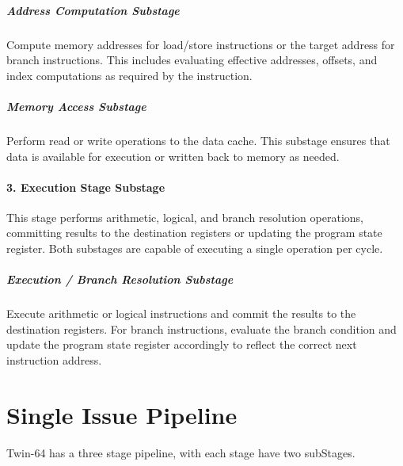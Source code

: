 \subparagraph{Address Computation Substage}
Compute memory addresses for load/store instructions or the target address for
branch instructions. This includes evaluating effective addresses, offsets,
and index computations as required by the instruction.

\subparagraph{Memory Access Substage}
Perform read or write operations to the data cache. This substage ensures that
data is available for execution or written back to memory as needed.

\paragraph{3. Execution Stage Substage}
This stage performs arithmetic, logical, and branch resolution operations,
committing results to the destination registers or updating the program state
register. Both substages are capable of executing a single operation per cycle.

\subparagraph{Execution / Branch Resolution Substage}
Execute arithmetic or logical instructions and commit the results to the
destination registers. For branch instructions, evaluate the branch condition
and update the program state register accordingly to reflect the correct next
instruction address.


\section*{Single Issue Pipeline}

Twin-64 has a three stage pipeline, with each stage have two subStages.

